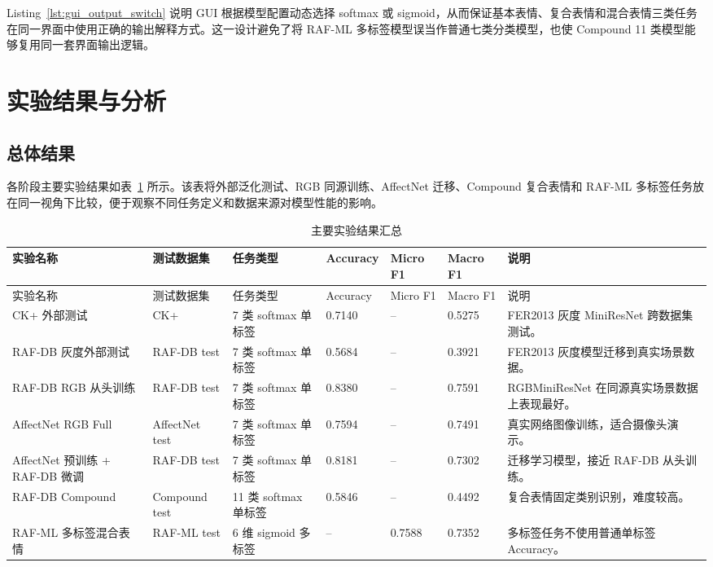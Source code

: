 \documentclass[UTF8,a4paper,12pt]{ctexart}
\begin{document}
Listing~\ref{lst:gui_output_switch} 说明 GUI 根据模型配置动态选择 softmax 或 sigmoid，从而保证基本表情、复合表情和混合表情三类任务在同一界面中使用正确的输出解释方式。这一设计避免了将 RAF-ML 多标签模型误当作普通七类分类模型，也使 Compound 11 类模型能够复用同一套界面输出逻辑。

\section{实验结果与分析}

\subsection{总体结果}

各阶段主要实验结果如表~\ref{tab:main_results} 所示。该表将外部泛化测试、RGB 同源训练、AffectNet 迁移、Compound 复合表情和 RAF-ML 多标签任务放在同一视角下比较，便于观察不同任务定义和数据来源对模型性能的影响。

{\scriptsize
\setlength{\tabcolsep}{2pt}
\renewcommand{\arraystretch}{1.15}
\begin{longtable}{p{}p{}p{}p{}p{}p{}p{}}
  \caption{主要实验结果汇总}
  \label{tab:main_results}\\
  \toprule
  实验名称 & 测试数据集 & 任务类型 & Accuracy & Micro F1 & Macro F1 & 说明 \\
  \midrule
  \endfirsthead
  \toprule
  实验名称 & 测试数据集 & 任务类型 & Accuracy & Micro F1 & Macro F1 & 说明 \\
  \midrule
  \endhead
  CK+ 外部测试 & CK+ & 7 类 softmax 单标签 & 0.7140 & -- & 0.5275 & FER2013 灰度 MiniResNet 跨数据集测试。\\
  RAF-DB 灰度外部测试 & RAF-DB test & 7 类 softmax 单标签 & 0.5684 & -- & 0.3921 & FER2013 灰度模型迁移到真实场景数据。\\
  RAF-DB RGB 从头训练 & RAF-DB test & 7 类 softmax 单标签 & 0.8380 & -- & 0.7591 & RGBMiniResNet 在同源真实场景数据上表现最好。\\
  AffectNet RGB Full & AffectNet test & 7 类 softmax 单标签 & 0.7594 & -- & 0.7491 & 真实网络图像训练，适合摄像头演示。\\
  AffectNet 预训练 + RAF-DB 微调 & RAF-DB test & 7 类 softmax 单标签 & 0.8181 & -- & 0.7302 & 迁移学习模型，接近 RAF-DB 从头训练。\\
  RAF-DB Compound & Compound test & 11 类 softmax 单标签 & 0.5846 & -- & 0.4492 & 复合表情固定类别识别，难度较高。\\
  RAF-ML 多标签混合表情 & RAF-ML test & 6 维 sigmoid 多标签 & -- & 0.7588 & 0.7352 & 多标签任务不使用普通单标签 Accuracy。\\
  \bottomrule
\end{longtable}
}
\end{document}
